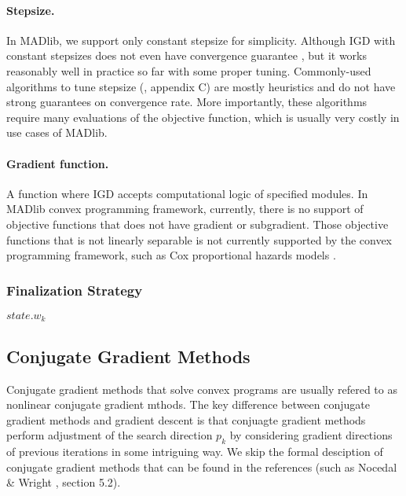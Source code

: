 \paragraph{Stepsize.}
In MADlib, we support only constant stepsize for simplicity.
Although IGD with constant stepsizes does not even have convergence guarantee \cite{springerlink:10.1007/s10107-011-0472-0}, but it works reasonably well in practice so far \cite{DBLP:conf/sigmod/FengKRR12} with some proper tuning.
Commonly-used algorithms to tune stepsize (\cite{bertsekas1999nonlinear}, appendix C) are mostly heuristics and do not have strong guarantees on convergence rate.
More importantly, these algorithms require many evaluations of the objective function, which is usually very costly in use cases of MADlib.

\paragraph{Gradient function.}
A function where IGD accepts computational logic of specified modules.
In MADlib convex programming framework, currently, there is no support of objective functions that does not have gradient or subgradient.
Those objective functions that is not linearly separable is not currently supported by the convex programming framework, such as Cox proportional hazards models \cite{Cox1972}.

\subsubsection{Finalization Strategy}
\begin{algorithm} \label{alg:finalization-igd}
\begin{algorithmic}[1]
    \State \Return $\mathit{state}.w_k$
\end{algorithmic}
\end{algorithm}

\subsection{Conjugate Gradient Methods}
Conjugate gradient methods that solve convex programs are usually refered to as nonlinear conjugate gradient mthods.
The key difference between conjugate gradient methods and gradient descent is that conjuagte gradient methods perform adjustment of the search direction $p_k$ by considering gradient directions of previous iterations in some intriguing way.
We skip the formal desciption of conjugate gradient methods that can be found in the references (such as Nocedal \& Wright \cite{nocedal2006numerical}, section 5.2).

